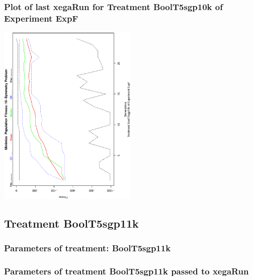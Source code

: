 \documentclass[18pt,c]{beamer}
\begin{document}
 \begin{frame}
 \frametitle{ Plot of last xegaRun for Treatment BoolT5sgp10k of Experiment ExpF }
 \begin{center}
\includegraphics[width=0.5\textwidth, angle=-90]
{ExpFPlotPopStatsFigure000.eps}
 \end{center}
 \label{report/ExpFPlotPopStatsFigure000.eps}  
 \end{frame}

\clearpage
\subsection{Treatment BoolT5sgp11k}

 \begin{frame}
 \fontsize{8pt}{9pt}\selectfont
 \frametitle{  Parameters of treatment: BoolT5sgp11k 
 }

 \label{ExpFtParmTable004.tex}  
 \end{frame}


 \begin{frame}
 \fontsize{8pt}{9pt}\selectfont
 \frametitle{  Parameters of treatment BoolT5sgp11k passed to xegaRun
 }

 \label{ExpFtParmTable005.tex}  
 \end{frame}
\end{document}
